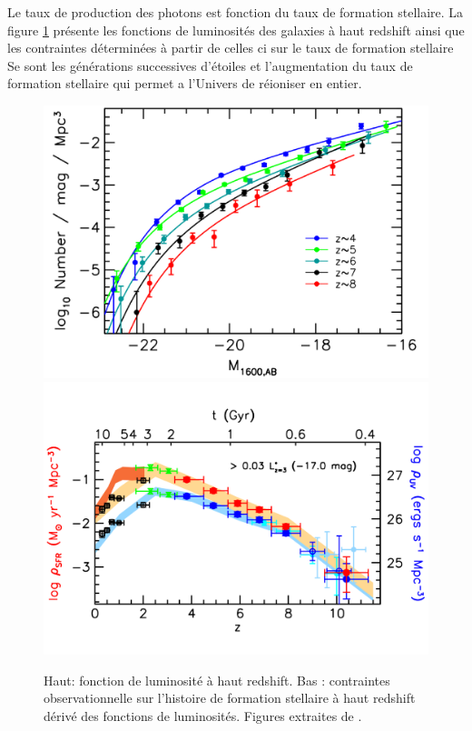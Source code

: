 Le taux de production des photons est fonction du taux de formation stellaire.
La figure \ref{fig:obs} présente les fonctions de luminosités des galaxies à haut redshift ainsi que les contraintes déterminées à partir de celles ci sur le taux de formation stellaire
Se sont les générations successives d'étoiles et l'augmentation du taux de formation stellaire qui permet a l'Univers de réioniser en entier.

\begin{figure}
		\includegraphics[width=.95\linewidth]{img/01/UV_lum_obs.pdf} 
        \includegraphics[width=.95\linewidth]{img/01/SFR_obs.pdf} 
        \caption[Contrainte SFH]{Haut: fonction de luminosité à haut redshift. 
        Bas : contraintes observationnelle sur l'histoire de formation stellaire à haut redshift dérivé des fonctions de luminosités. 
        Figures extraites de \cite{bouwens_reionization_2015}.
 		\label{fig:obs}}
\end{figure}

